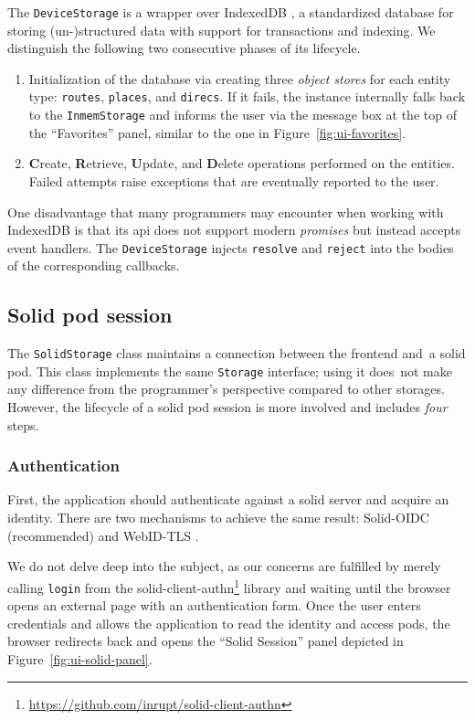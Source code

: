 The \texttt{DeviceStorage} is a wrapper over IndexedDB \cite{indexeddb18}, a standardized data\-base for storing (un-)structured data with support for transactions and indexing. We distinguish the following two consecutive phases of its lifecycle.

\begin{enumerate}
\item Initialization of the database via creating three \emph{object stores} for each entity type: \texttt{routes}, \texttt{places}, and \texttt{direcs}. If it fails, the instance internally falls back to the \texttt{InmemStorage} and informs the user via the message box at the top of the ``Favorites'' panel, similar to the one in Figure~\ref{fig:ui-favorites}.
\item \textbf{C}reate, \textbf{R}etrieve, \textbf{U}pdate, and \textbf{D}elete operations performed on the entities. Failed attempts raise exceptions that are eventually reported to the user.
\end{enumerate}

One disadvantage that many programmers may encounter when working with IndexedDB is that its \acs{api} does not support modern \emph{promises} but instead accepts event handlers. The \texttt{DeviceStorage} injects \texttt{resolve} and \texttt{reject} into the bodies of the corresponding callbacks.

\subsection{Solid pod session}

The \texttt{SolidStorage} class maintains a connection between the frontend and~a \acs{solid} pod. This class implements the same \texttt{Storage} interface; using it does~not make any difference from the programmer's perspective compared to other storages. However, the lifecycle of a \acs{solid} pod session is more involved and includes \emph{four} steps.

\subsubsection{Authentication}

First, the application should authenticate against a \acs{solid} server and acquire an identity. There are two mechanisms to achieve the same result: Solid-OIDC (recommended) and WebID-TLS \cite[Authentication]{solid22}.

We do not delve deep into the subject, as our concerns are fulfilled by merely calling \texttt{login} from the solid-client-authn\footnote{\href{https://github.com/inrupt/solid-client-authn}{https://github.com/inrupt/solid-client-authn}} library and waiting until the browser opens an external page with an authentication form. Once the user enters credentials and allows the application to read the identity and access pods, the browser redirects back and opens the ``Solid Session'' panel depicted in Figure~\ref{fig:ui-solid-panel}.

